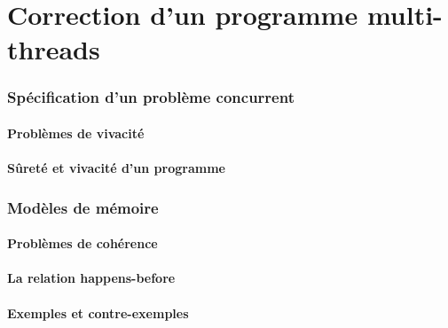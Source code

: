 \documentclass[9pt, handout]{beamer}
\begin{document}
 
\part{Correction d'un programme multi-threads}
 
\section{Spécification d'un problème concurrent}
 
\subsection{Problèmes de vivacité}





 
\subsection{Sûreté et vivacité d'un programme}




 
\section{Modèles de mémoire}
  
\subsection{Problèmes de cohérence}





 
\subsection{La relation happens-before}




 
\subsection{Exemples et contre-exemples}





 
\end{document}
